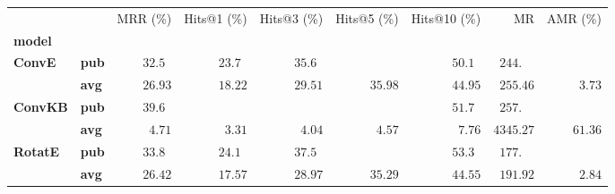 \begin{tabular}{llrrrrrrr}
\toprule
       &     &           MRR (\%) &        Hits@1 (\%) &        Hits@3 (\%) &        Hits@5 (\%) &       Hits@10 (\%) &                             MR &           AMR (\%) \\
\textbf{model} & {} &                    &                    &                    &                    &                    &                                &                    \\
\midrule
\textbf{ConvE} & \textbf{pub} &  $32.5\phantom{0}$ &  $23.7\phantom{0}$ &  $35.6\phantom{0}$ &                    &  $50.1\phantom{0}$ &  $\phantom{0}244.\phantom{00}$ &                    \\
       & \textbf{avg} &            $26.93$ &            $18.22$ &            $29.51$ &            $35.98$ &            $44.95$ &            $\phantom{0}255.46$ &  $\phantom{0}3.73$ \\
\textbf{ConvKB} & \textbf{pub} &  $39.6\phantom{0}$ &                    &                    &                    &  $51.7\phantom{0}$ &  $\phantom{0}257.\phantom{00}$ &                    \\
       & \textbf{avg} &  $\phantom{0}4.71$ &  $\phantom{0}3.31$ &  $\phantom{0}4.04$ &  $\phantom{0}4.57$ &  $\phantom{0}7.76$ &                      $4345.27$ &            $61.36$ \\
\textbf{RotatE} & \textbf{pub} &  $33.8\phantom{0}$ &  $24.1\phantom{0}$ &  $37.5\phantom{0}$ &                    &  $53.3\phantom{0}$ &  $\phantom{0}177.\phantom{00}$ &                    \\
       & \textbf{avg} &            $26.42$ &            $17.57$ &            $28.97$ &            $35.29$ &            $44.55$ &            $\phantom{0}191.92$ &  $\phantom{0}2.84$ \\
\bottomrule
\end{tabular}


